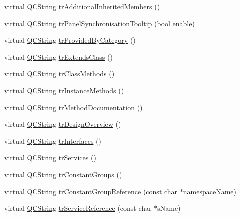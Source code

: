 \begin{DoxyCompactItemize}
virtual \mbox{\hyperlink{class_q_c_string}{Q\+C\+String}} \mbox{\hyperlink{class_translator_italian_a82f2eeea8a3292c31ed0c3fa6fea4f3c}{tr\+Additional\+Inherited\+Members}} ()
\item 
virtual \mbox{\hyperlink{class_q_c_string}{Q\+C\+String}} \mbox{\hyperlink{class_translator_italian_a1e4a5f6c20c6d176fe9d13b9357f412e}{tr\+Panel\+Synchronisation\+Tooltip}} (bool enable)
\item 
virtual \mbox{\hyperlink{class_q_c_string}{Q\+C\+String}} \mbox{\hyperlink{class_translator_italian_a8fcbea3a9189356878ca2bdc947a5f08}{tr\+Provided\+By\+Category}} ()
\item 
virtual \mbox{\hyperlink{class_q_c_string}{Q\+C\+String}} \mbox{\hyperlink{class_translator_italian_a7ff4a745cd1b2178954a0811d3a8600f}{tr\+Extends\+Class}} ()
\item 
virtual \mbox{\hyperlink{class_q_c_string}{Q\+C\+String}} \mbox{\hyperlink{class_translator_italian_a273c45547daf5158e140d6db151ee7c9}{tr\+Class\+Methods}} ()
\item 
virtual \mbox{\hyperlink{class_q_c_string}{Q\+C\+String}} \mbox{\hyperlink{class_translator_italian_aaa9ca1c3fda188f220c85c4bc623310a}{tr\+Instance\+Methods}} ()
\item 
virtual \mbox{\hyperlink{class_q_c_string}{Q\+C\+String}} \mbox{\hyperlink{class_translator_italian_a27663689e78dd03b14e950cf9c97e04a}{tr\+Method\+Documentation}} ()
\item 
virtual \mbox{\hyperlink{class_q_c_string}{Q\+C\+String}} \mbox{\hyperlink{class_translator_italian_ad63fde2ac0d62192543ea391a7bc9b3d}{tr\+Design\+Overview}} ()
\item 
virtual \mbox{\hyperlink{class_q_c_string}{Q\+C\+String}} \mbox{\hyperlink{class_translator_italian_a4e17eb98672492f847bbcb418e949183}{tr\+Interfaces}} ()
\item 
virtual \mbox{\hyperlink{class_q_c_string}{Q\+C\+String}} \mbox{\hyperlink{class_translator_italian_ab801dd0563df15870ced24814b437cff}{tr\+Services}} ()
\item 
virtual \mbox{\hyperlink{class_q_c_string}{Q\+C\+String}} \mbox{\hyperlink{class_translator_italian_a7fab084fa0806a6e7a4eb26953125a39}{tr\+Constant\+Groups}} ()
\item 
virtual \mbox{\hyperlink{class_q_c_string}{Q\+C\+String}} \mbox{\hyperlink{class_translator_italian_ac5021acc5a905b4d82c01f66f9eb178f}{tr\+Constant\+Group\+Reference}} (const char $\ast$namespace\+Name)
\item 
virtual \mbox{\hyperlink{class_q_c_string}{Q\+C\+String}} \mbox{\hyperlink{class_translator_italian_a239b2cf098864a4232a87fe148de64e5}{tr\+Service\+Reference}} (const char $\ast$s\+Name)

\end{DoxyCompactItemize}
